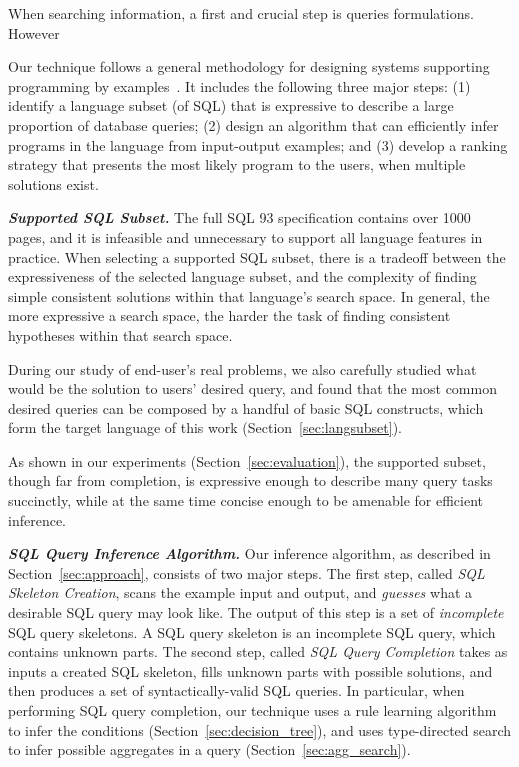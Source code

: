 When searching information, a first and
crucial step is queries formulations. However


Our technique follows a general methodology for designing
systems supporting programming by examples~\cite{Harris:2011}.
It includes the following three major steps:
(1) identify a language subset (of SQL) that is expressive to
describe a large proportion of %
database queries; (2) design an algorithm that
can efficiently infer programs in the language from input-output
examples; and (3) develop a ranking strategy that presents
the most likely program to the users, when multiple solutions exist.

\vspace{1mm}
\noindent \textbf{\textit{Supported SQL Subset.}}
The full SQL 93 specification contains over 1000 pages, and it is
infeasible and unnecessary to support all language features in practice.
When selecting a supported SQL subset, there is a tradeoff
between the expressiveness of the selected language subset,
and the complexity of finding simple consistent solutions
within that language's search space.  In general, the more expressive a search
space, the harder the task of finding consistent hypotheses within
that search space. 

During our study of end-user's real problems, we also carefully studied what would
be the solution to users' desired query, and found that the most common
desired queries can be composed by a handful of basic SQL constructs,
which form the target language of this work (Section~\ref{sec:langsubset}).

As shown in our experiments (Section~\ref{sec:evaluation}), the supported subset, though far from completion, is expressive
enough to describe many query tasks succinctly, while at the same time concise
enough to be amenable for efficient inference. 



\vspace{1mm}
\noindent \textbf{\textit{SQL Query Inference Algorithm.}} Our inference
algorithm, as described in Section~\ref{sec:approach}, consists of two
major steps. The first step, called \textit{SQL Skeleton Creation}, scans
the example input and output, and \textit{guesses} what a desirable
SQL query may look like. The output of this step is a set of \textit{incomplete} SQL
query skeletons. A SQL query skeleton is an incomplete SQL query,
which contains unknown parts. The second step,
called \textit{SQL Query Completion} takes as inputs a created
SQL skeleton, fills unknown parts with possible solutions, and then produces a set of
syntactically-valid SQL queries. In particular, when performing
SQL query completion, our technique uses a rule learning algorithm
to infer the conditions (Section~\ref{sec:decision_tree}), and uses 
type-directed search to infer possible aggregates in a query (Section~\ref{sec:agg_search}).

